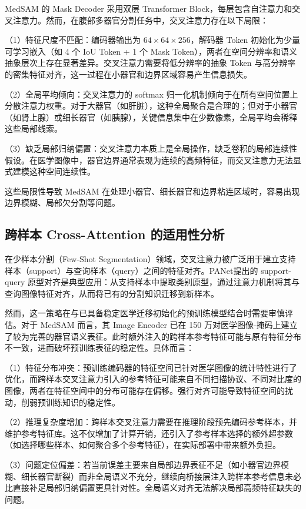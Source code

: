 MedSAM 的 Mask Decoder 采用双层 Transformer Block，每层包含自注意力和交叉注意力。然而，在腹部多器官分割任务中，交叉注意力存在以下局限：

（1）特征尺度不匹配：编码器输出为 $64 \times 64 \times 256$，解码器 Token 初始化为少量可学习嵌入（如 4 个 IoU Token + 1 个 Mask Token），两者在空间分辨率和语义抽象层次上存在显著差异。交叉注意力需要将低分辨率的抽象 Token 与高分辨率的密集特征对齐，这一过程在小器官和边界区域容易产生信息损失。

（2）全局平均倾向：交叉注意力的 softmax 归一化机制倾向于在所有空间位置上分散注意力权重。对于大器官（如肝脏），这种全局聚合是合理的；但对于小器官（如肾上腺）或细长器官（如胰腺），关键信息集中在少数像素，全局平均会稀释这些局部线索。

（3）缺乏局部归纳偏置：交叉注意力本质上是全局操作，缺乏卷积的局部连续性假设。在医学图像中，器官边界通常表现为连续的高频特征，而交叉注意力无法显式建模这种空间连续性。

这些局限性导致 MedSAM 在处理小器官、细长器官和边界粘连区域时，容易出现边界模糊、局部欠分割等问题。

\subsection{跨样本 Cross-Attention 的适用性分析}

在少样本分割（Few-Shot Segmentation）领域，交叉注意力被广泛用于建立支持样本（support）与查询样本（query）之间的特征对齐。PANet\cite{wang2019panet}提出的 support-query 原型对齐是典型应用：从支持样本中提取类别原型，通过注意力机制将其与查询图像特征对齐，从而将已有的分割知识迁移到新样本。

然而，这一策略在与已具备稳定医学迁移初始化的预训练模型结合时需要审慎评估。对于 MedSAM 而言，其 Image Encoder 已在 150 万对医学图像-掩码上建立了较为完善的器官语义表征。此时额外注入的跨样本参考特征可能与原有特征分布不一致，进而破坏预训练表征的稳定性。具体而言：

（1）特征分布冲突：预训练编码器的特征空间已针对医学图像的统计特性进行了优化，而跨样本交叉注意力引入的参考特征可能来自不同扫描协议、不同对比度的图像，两者在特征空间中的分布可能存在偏移。强行对齐可能导致特征空间的扰动，削弱预训练知识的稳定性。

（2）推理复杂度增加：跨样本交叉注意力需要在推理阶段预先编码参考样本，并维护参考特征库。这不仅增加了计算开销，还引入了参考样本选择的额外超参数（如选择哪些样本、如何聚合多个参考特征），在实际部署中带来额外负担。

（3）问题定位偏差：若当前误差主要来自局部边界表征不足（如小器官边界模糊、细长器官断裂）而非全局语义不充分，继续向桥接层注入跨样本参考信息未必比直接补足局部归纳偏置更具针对性。全局语义对齐无法解决局部高频特征缺失的问题。

